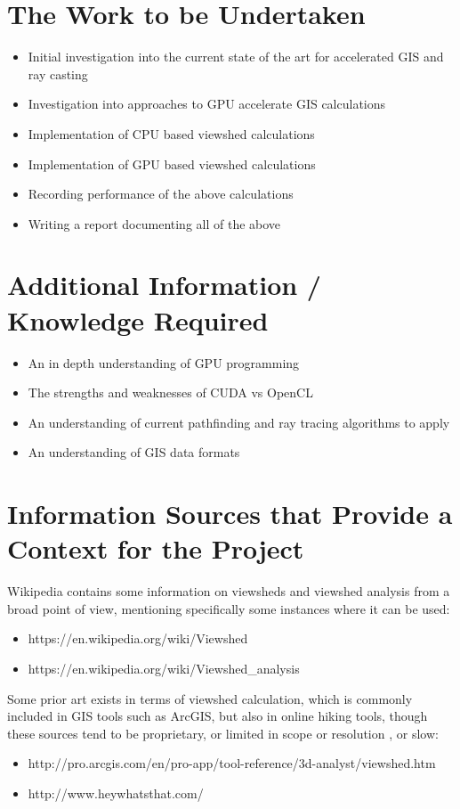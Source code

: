 \documentclass[a4paper]{article}
\begin{document}
    \section{The Work to be Undertaken}
        \begin{itemize}
            \item Initial investigation into the current state of the art for accelerated GIS and ray casting
            \item Investigation into approaches to GPU accelerate GIS calculations
            \item Implementation of CPU based viewshed calculations
            \item Implementation of GPU based viewshed calculations
            \item Recording performance of the above calculations
            \item Writing a report documenting all of the above
        \end{itemize}
    \section{Additional Information / Knowledge Required}
        \begin{itemize}
            \item An in depth understanding of GPU programming
            \item The strengths and weaknesses of CUDA vs OpenCL
            \item An understanding of current pathfinding and ray tracing algorithms to apply
            \item An understanding of GIS data formats
        \end{itemize}
    \section{Information Sources that Provide a Context for the Project}
        Wikipedia contains some information on viewsheds and viewshed analysis from a broad point of view, mentioning
        specifically some instances where it can be used:
        \begin{itemize}
            \item https://en.wikipedia.org/wiki/Viewshed
            \item https://en.wikipedia.org/wiki/Viewshed\_analysis
        \end{itemize}

        Some prior art exists in terms of viewshed calculation, which is commonly included in GIS tools such as ArcGIS,
        but also in online hiking tools, though these sources tend to be proprietary, or limited in scope or resolution
        , or slow:
        \begin{itemize}
            \item http://pro.arcgis.com/en/pro-app/tool-reference/3d-analyst/viewshed.htm
            \item http://www.heywhatsthat.com/
        \end{itemize}
\end{document}
